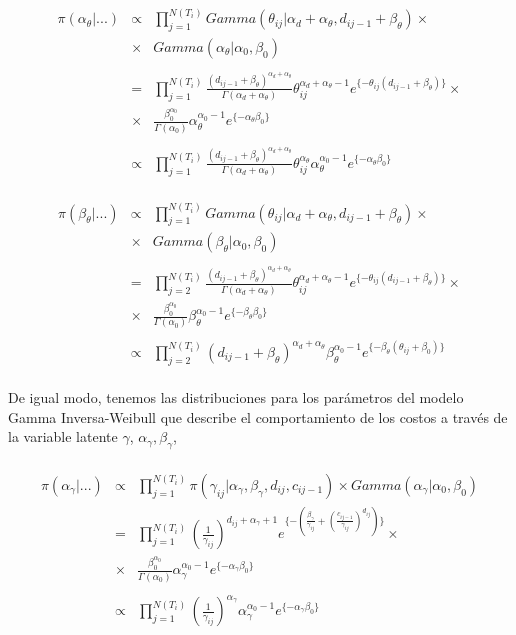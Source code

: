 \\
\begin{eqnarray*}
\pi(\alpha_\theta|...)&\propto&\prod_{j=1}^{N(T_i)} Gamma(\theta_{ij}|\alpha_d+\alpha_\theta,d_{ij-1}+\beta_\theta)\times\\
&\times& Gamma(\alpha_\theta|\alpha_0,\beta_0)\\
\\
&=&\prod_{j=1}^{N(T_i)}\frac{(d_{ij-1}+\beta_\theta)^{\alpha_d+\alpha_\theta}}{\Gamma(\alpha_d+\alpha_\theta)} \theta_{ij}^{\alpha_d+\alpha_\theta-1} e^{\{-\theta_{ij}(d_{ij-1}+\beta_\theta)\}}\times\\
&\times&\frac{\beta_0^{\alpha_0}}{\Gamma(\alpha_0)} \alpha_\theta^{\alpha_0-1}e^{\{-\alpha_\theta\beta_0\}}\\
\\
&\propto& \prod_{j=1}^{N(T_i)}\frac{(d_{ij-1}+\beta_\theta)^{\alpha_d+\alpha_\theta}}{\Gamma(\alpha_d+\alpha_\theta)} \theta_{ij}^{\alpha_\theta}\alpha_\theta^{\alpha_0-1}e^{\{-\alpha_\theta\beta_0\}}
\end{eqnarray*}
\\
\begin{eqnarray*}
\pi(\beta_\theta|...)&\propto&\prod_{j=1}^{N(T_i)} Gamma(\theta_{ij}|\alpha_d+\alpha_\theta,d_{ij-1}+\beta_\theta)\times\\
&\times& Gamma(\beta_\theta|\alpha_0,\beta_0)\\
\\
&=&\prod_{j=2}^{N(T_i)}\frac{(d_{ij-1}+\beta_\theta)^{\alpha_d+\alpha_\theta}}{\Gamma(\alpha_d+\alpha_\theta)} \theta_{ij}^{\alpha_d+\alpha_\theta-1} e^{\{-\theta_{ij}(d_{ij-1}+\beta_\theta)\}}\times\\
&\times& \frac{\beta_0^{\alpha_0}}{\Gamma(\alpha_0)} \beta_\theta^{\alpha_0-1}e^{\{-\beta_\theta\beta_0\}}\\
\\
&\propto&\prod_{j=2}^{N(T_i)}(d_{ij-1}+\beta_\theta)^{\alpha_d+\alpha_\theta}\beta_\theta^{\alpha_0-1} e^{\{-\beta_\theta(\theta_{ij}+\beta_0)\}}
\end{eqnarray*}
\\
De igual modo, tenemos las distribuciones para los par\'ametros del modelo Gamma Inversa-Weibull que describe el comportamiento de los costos a trav\'es de la variable latente $\gamma$, $\alpha_\gamma, \beta_\gamma$,\\
\\
\begin{eqnarray*}
\pi(\alpha_\gamma|...)&\propto&\prod_{j=1}^{N(T_i)} \pi(\gamma_{ij}|\alpha_\gamma,\beta_\gamma,d_{ij},c_{ij-1})\times Gamma(\alpha_\gamma|\alpha_0,\beta_0)\\
&=&\prod_{j=1}^{N(T_i)}\left(\frac{1}{\gamma_{ij}}\right)^{d_{ij}+\alpha_\gamma+1}e^{\{-(\frac{\beta_\gamma}{\gamma_{ij}}+(\frac{c_{ij-1}}{\gamma_{ij}})^{d_{ij}})\}}\times \\
&\times& \frac{\beta_0^{\alpha_0}}{\Gamma(\alpha_0)} \alpha_\gamma^{\alpha_0-1}e^{\{-\alpha_\gamma\beta_0\}}\\
\\
&\propto&\prod_{j=1}^{N(T_i)} \left(\frac{1}{\gamma_{ij}}\right)^{\alpha_\gamma}\alpha_\gamma^{\alpha_0-1}e^{\{-\alpha_\gamma\beta_0\}}
\end{eqnarray*}
